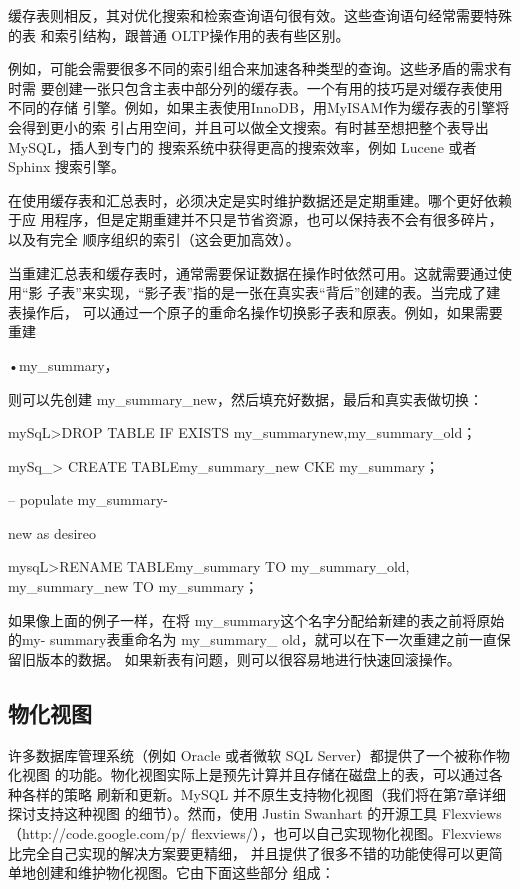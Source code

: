 缓存表则相反，其对优化搜索和检索查询语句很有效。这些查询语句经常需要特殊的表
和索引结构，跟普通 OLTP操作用的表有些区别。

例如，可能会需要很多不同的索引组合来加速各种类型的查询。这些矛盾的需求有时需
要创建一张只包含主表中部分列的缓存表。一个有用的技巧是对缓存表使用不同的存储
引擎。例如，如果主表使用InnoDB，用MyISAM作为缓存表的引擎将会得到更小的索
引占用空间，并且可以做全文搜索。有时甚至想把整个表导出 MySQL，插人到专门的
搜索系统中获得更高的搜索效率，例如 Lucene 或者 Sphinx 搜索引擎。

在使用缓存表和汇总表时，必须决定是实时维护数据还是定期重建。哪个更好依赖于应
用程序，但是定期重建并不只是节省资源，也可以保持表不会有很多碎片，以及有完全
顺序组织的索引（这会更加高效）。

当重建汇总表和缓存表时，通常需要保证数据在操作时依然可用。这就需要通过使用“影
子表”来实现，“影子表”指的是一张在真实表“背后”创建的表。当完成了建表操作后，
可以通过一个原子的重命名操作切换影子表和原表。例如，如果需要重建

•my\_summary，

则可以先创建 my\_summary\_new，然后填充好数据，最后和真实表做切换：

mySqL>DROP TABLE IF EXISTS my\_summarynew,my\_summary\_old；

mySq\_> CREATE TABLEmy\_summary\_new CKE my\_summary；

-- populate my\_summary-

new as desireo

mysqL>RENAME TABLEmy\_summary TO my\_summary\_old, my\_summary\_new TO my\_summary；

如果像上面的例子一样，在将 my\_summary这个名字分配给新建的表之前将原始的my-
summary表重命名为 my\_summary\_ old，就可以在下一次重建之前一直保留旧版本的数据。
如果新表有问题，则可以很容易地进行快速回滚操作。

\subsection{物化视图}
许多数据库管理系统（例如 Oracle 或者微软 SQL Server）都提供了一个被称作物化视图
的功能。物化视图实际上是预先计算并且存储在磁盘上的表，可以通过各种各样的策略
刷新和更新。MySQL 并不原生支持物化视图（我们将在第7章详细探讨支持这种视图
的细节）。然而，使用 Justin Swanhart 的开源工具 Flexviews （http://code.google.com/p/
flexviews/），也可以自己实现物化视图。Flexviews 比完全自己实现的解决方案要更精细，
并且提供了很多不错的功能使得可以更简单地创建和维护物化视图。它由下面这些部分
组成：

